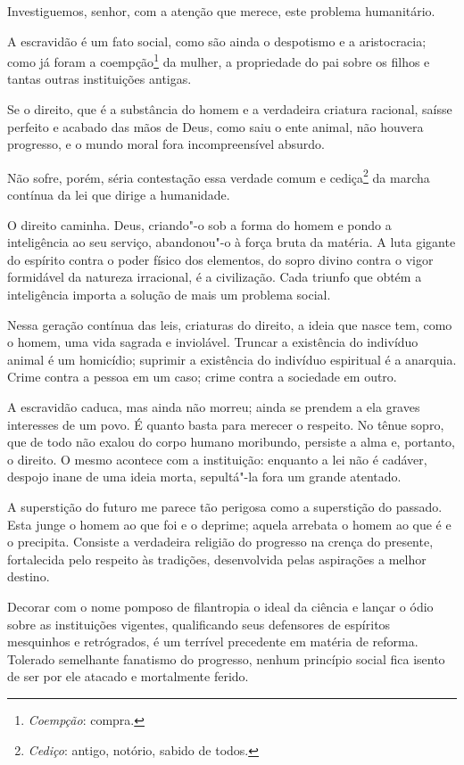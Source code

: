 \sectionitem

\begin{linenumbers}

Investiguemos, senhor, com a atenção que merece, este problema humanitário.

A escravidão é um fato social, como são ainda o despotismo e a
aristocracia; como já foram a coempção\footnote{ \textit{Coempção}: compra.}
 da mulher, a propriedade do pai sobre os filhos e tantas outras
instituições antigas.

Se o direito, que é a substância do homem e a verdadeira criatura
racional, saísse perfeito e acabado das mãos de Deus, como saiu o ente
animal, não houvera progresso, e o mundo moral fora incompreensível absurdo. 

Não sofre, porém, séria contestação essa verdade comum e
cediça\footnote{ \textit{Cediço}: antigo, notório, sabido de todos.}
 da marcha contínua da lei que dirige a humanidade. 

O direito caminha. Deus, criando"-o sob a forma do homem e pondo a
inteligência ao seu serviço, abandonou"-o à força bruta da matéria. A
luta gigante do espírito contra o poder físico dos elementos, do sopro
divino contra o vigor formidável da natureza irracional, é a
civilização. Cada triunfo que obtém a inteligência importa a solução de
mais um problema social.

Nessa geração contínua das leis, criaturas do direito, a ideia que nasce
tem, como o homem, uma vida sagrada e inviolável. Truncar a existência
do indivíduo animal é um homicídio; suprimir a existência do indivíduo
espiritual é a anarquia. Crime contra a pessoa em um caso; crime contra
a sociedade em outro.

A escravidão caduca, mas ainda não morreu; ainda se prendem a ela graves
interesses de um povo. É quanto basta para merecer o respeito. No tênue
sopro, que de todo não exalou do corpo humano moribundo, persiste a
alma e, portanto, o direito. O mesmo acontece com a instituição:
enquanto a lei não é cadáver, despojo inane de uma ideia morta,
sepultá"-la fora um grande atentado.

A superstição do futuro me parece tão perigosa como a superstição do
passado. Esta junge o homem ao que foi e o deprime; aquela arrebata o
homem ao que é e o precipita. Consiste a verdadeira religião do
progresso na crença do presente, fortalecida pelo respeito às
tradições, desenvolvida pelas aspirações a melhor destino. 

Decorar com o nome pomposo de filantropia o ideal da ciência e lançar o
ódio sobre as instituições vigentes, qualificando seus defensores de
espíritos mesquinhos e retrógrados, é um terrível precedente em matéria
de reforma. Tolerado semelhante fanatismo do progresso, nenhum
princípio social fica isento de ser por ele atacado e mortalmente ferido.


\end{linenumbers}
